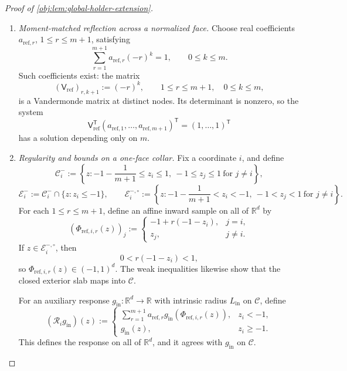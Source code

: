 \begin{proof}[Proof of \cref{obj:lem:global-holder-extension}]
\begin{enumerate}
\item \emph{Moment-matched reflection across a normalized face.}
Choose real coefficients \(a_{\mathrm{ref},r}\), \(1\le r\le m+1\), satisfying
\[
\sum_{r=1}^{m+1}a_{\mathrm{ref},r}(-r)^k=1,
\qquad 0\le k\le m.
\]
Such coefficients exist: the matrix
\[
(\mathsf V_{\mathrm{ref}})_{r,k+1}:=(-r)^k,
\qquad 1\le r\le m+1,\quad 0\le k\le m,
\]
is a Vandermonde matrix at distinct nodes. Its determinant is nonzero, so the system
\[
\mathsf V_{\mathrm{ref}}^{\mathsf T}
(a_{\mathrm{ref},1},\ldots,a_{\mathrm{ref},m+1})^{\mathsf T}
=(1,\ldots,1)^{\mathsf T}
\]
has a solution depending only on \(m\).

\item\label{proof:global-holder-extension:face-collar} \emph{Regularity and bounds on a one-face collar.}
Fix a coordinate \(i\), and define
\[
\mathcal C_i^-:=
\left\{z:
-1-\frac1{m+1}\le z_i\le1,\
-1\le z_j\le1\ \text{for }j\ne i
\right\},
\]
\[
\mathcal E_i^-:=\mathcal C_i^-\cap\{z:z_i\le-1\},
\qquad
\mathcal E_i^{-,\circ}:=
\left\{z:
-1-\frac1{m+1}<z_i<-1,\
-1<z_j<1\ \text{for }j\ne i
\right\}.
\]
For each \(1\le r\le m+1\), define an affine inward sample on all of \(\mathbb R^d\) by
\[
(\Phi_{\mathrm{ref},i,r}(z))_j
:=
\begin{cases}
-1+r(-1-z_i),&j=i,\\
z_j,&j\ne i.
\end{cases}
\]
If \(z\in\mathcal E_i^{-,\circ}\), then
\[
0<r(-1-z_i)<1,
\]
so \(\Phi_{\mathrm{ref},i,r}(z)\in(-1,1)^d\). The weak inequalities likewise show that the closed exterior slab maps into \(\mathcal C\).

For an auxiliary response \(g_{\mathrm{in}}:\mathbb R^d\to\mathbb R\) with intrinsic radius \(L_{\mathrm{in}}\) on \(\mathcal C\), define
\[
(\mathscr R_i g_{\mathrm{in}})(z)
:=
\begin{cases}
\displaystyle\sum_{r=1}^{m+1}
a_{\mathrm{ref},r}g_{\mathrm{in}}(\Phi_{\mathrm{ref},i,r}(z)),
&z_i<-1,\\
g_{\mathrm{in}}(z),&z_i\ge-1.
\end{cases}
\]
This defines the response on all of \(\mathbb R^d\), and it agrees with \(g_{\mathrm{in}}\) on \(\mathcal C\).


\end{enumerate}
\end{proof}
